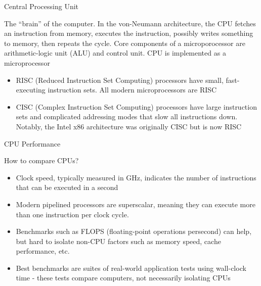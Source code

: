 \documentclass{beamer}
\begin{document}
\begin{frame}{Central Processing Unit}

The ``brain'' of the computer.  In the von-Neumann architecture, the
CPU fetches an instruction from memory, executes the instruction,
possibly writes something to memory, then repeats the cycle.  Core
components of a microporocessor are arithmetic-logic unit (ALU) and
control unit.  CPU is implemented as a microprocessor
\begin{itemize}
\item RISC (Reduced Instruction Set Computing) processors have small,
  fast-executing instruction sets.  All modern microprocessors are
  RISC
\item CISC (Complex Instruction Set Computing) processors have large
  instruction sets and complicated addressing modes that slow all
  instructions down.  Notably, the Intel x86 architecture was
  originally CISC but is now RISC
\end{itemize}
\end{frame}

\begin{frame}{CPU Performance}

How to compare CPUs?
\begin{itemize}
\item Clock speed, typically measured in GHz, indicates the number of
  instructions that can be executed in a second
\item Modern pipelined processors are superscalar, meaning they can
  execute more than one instruction per clock cycle.
\item Benchmarks such as FLOPS (floating-point operations persecond)
  can help, but hard to isolate non-CPU factors such as memory speed,
  cache performance, etc.
\item Best benchmarks are suites of real-world application tests using
  wall-clock time - these tests compare computers, not necessarily
  isolating CPUs
\end{itemize}
\end{frame}
\end{document}
